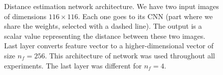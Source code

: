 \begin{figure}[ht!]
\begin{subfigure}[t]{0.5\linewidth}
    \end{subfigure}
    \caption{%
        Distance estimation network architecture.
        We have two input images of dimensions $116 \times 116$.
        Each one goes to its CNN (part where we share the weights, selected with a dashed line).
        The output is a scalar value representing the distance between these two images.
        Last layer converts feature vector to a higher-dimensional vector of size $n_f=256$. This architecture of network was used throughout all experiments. The last layer was different for $n_f=4$.
    }\label{fig:de-architecture}
\end{figure}

